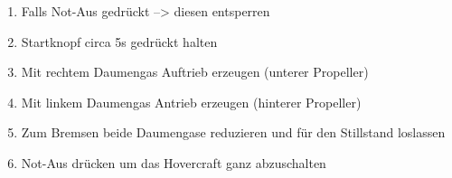 \begin{enumerate}
    \item Falls Not-Aus gedrückt --> diesen entsperren
    \item Startknopf circa 5s gedrückt halten
    \item Mit rechtem Daumengas Auftrieb erzeugen (unterer Propeller)
    \item Mit linkem Daumengas Antrieb erzeugen (hinterer Propeller)
    \item Zum Bremsen beide Daumengase reduzieren und für den Stillstand loslassen
    \item Not-Aus drücken um das Hovercraft ganz abzuschalten
\end{enumerate}